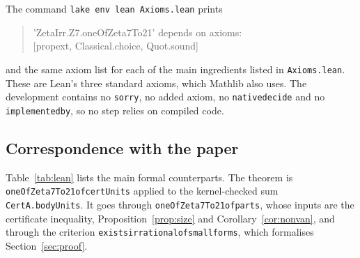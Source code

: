 \documentclass[11pt]{amsart}
\theoremstyle{definition}
\theoremstyle{remark}
\numberwithin{equation}{section}
\newcommand{\lean}[1]{{\def\_{\textunderscore\allowbreak}\texttt{#1}}}
\begin{document}
The command \lean{lake env lean Axioms.lean} prints
\begin{quote}\ttfamily\small
'ZetaIrr.Z7.oneOfZeta7To21' depends on axioms:\\
\hspace*{2em}[propext, Classical.choice, Quot.sound]
\end{quote}
and the same axiom list for each of the main ingredients listed in \lean{Axioms.lean}. These are Lean's three
standard axioms, which Mathlib also uses. The development contains no \lean{sorry}, no added axiom, no
\lean{native\_decide} and no \lean{implemented\_by}, so no step relies on compiled code.

\subsection{Correspondence with the paper}
Table~\ref{tab:lean} lists the main formal counterparts. The theorem is \lean{oneOfZeta7To21\_of\_certUnits}
applied to the kernel-checked sum \lean{CertA.bodyUnits\_400}. It goes through \lean{oneOfZeta7To21\_of\_parts},
whose inputs are the certificate inequality, Proposition~\ref{prop:size} and Corollary~\ref{cor:nonvan}, and through
the criterion \lean{exists\_irrational\_of\_small\_forms}, which formalises Section~\ref{sec:proof}.
\end{document}
